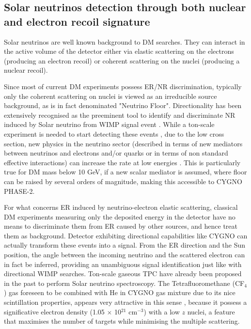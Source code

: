 \documentclass[physics,article,submit,moreauthors,pdftex]{Definitions/mdpi}
\begin{document}
\subsection{Solar neutrinos detection through both nuclear and electron recoil signature}
Solar neutrinos are well known background to DM searches. They can interact in the active volume of the detector either via elastic scattering on the electrons (producing an electron recoil) or coherent scattering on the nuclei (producing a nuclear recoil). 

Since most of current DM experiments possess ER/NR discrimination, typically only the coherent scattering on nuclei is viewed as an irreducible source background, as is in fact denominated "Neutrino Floor". Directionality has been extensively recognised as the preeminent tool to identify and discriminate NR induced by Solar neutrino from WIMP signal event \cite{Mayet:2016zxu,Vahsen:2020pzb, Billard:2013qya}. While a ton-scale experiment is needed to start detecting these events \cite{Vahsen:2020pzb}, due to the low cross section, new physics in the neutrino sector (described in terms of new mediators between neutrinos and electrons and/or quarks or in terms of non standard effective interactions) can increase the rate at low energies \cite{Boehm:2018sux}. This is particularly true for DM mass below 10 GeV, if a new scalar mediator is assumed, where floor can be raised by several orders of magnitude, making this accessible to CYGNO PHASE-2. 

For what concerns ER induced by neutrino-electron elastic scattering, classical DM experiments measuring only the deposited energy in the detector have no means to discriminate them from ER caused by other sources, and hence treat them as background. Detector exhibiting directional capabilities like CYGNO can actually transform these events into a signal. From the ER direction and the Sun position, the angle between the incoming neutrino and the scattered electron can in fact be inferred, providing an unambiguous signal identification just like with directional WIMP searches. Ton-scale gaseous TPC have already been proposed in the past \cite{Seguinot:1992zu,Arpesella:1996uc} to perform Solar neutrino spectroscopy. The Tetrafluoromethane (CF$_4$) gas foreseen to be combined with He in CYGNO gas mixture due to its nice scintillation properties, appears very attractive in this sense \cite{Arpesella:1996uc}, because it possess a significative electron density (1.05 $\times$ 10$^{21}$ cm$^{-3}$) with a low $z$ nuclei, a feature that maximises the number of targets while minimising the multiple scattering. 
\end{document}
